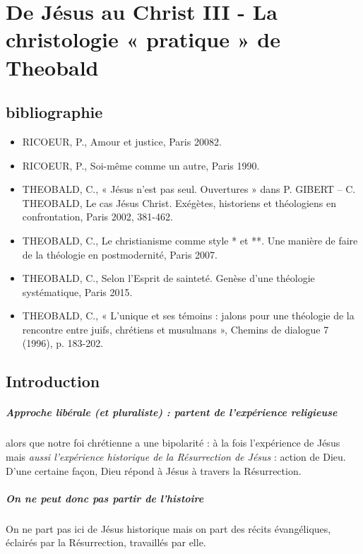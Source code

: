 \chapter{De Jésus au Christ III - La christologie « pratique » de Theobald}
 

\section{bibliographie}

\begin{itemize}
    \item RICOEUR, P., Amour et justice, Paris 20082.
   \item RICOEUR, P., Soi-même comme un autre, Paris 1990.
   \item THEOBALD, C., « Jésus n’est pas seul. Ouvertures » dans P. GIBERT – C. THEOBALD, Le cas
Jésus Christ. Exégètes, historiens et théologiens en confrontation, Paris 2002, 381-462.
   \item THEOBALD, C., Le christianisme comme style * et **. Une manière de faire de la théologie en
postmodernité, Paris 2007. \cite{theobald_christianisme_2007} 
   \item THEOBALD, C., Selon l’Esprit de sainteté. Genèse d’une théologie systématique, Paris 2015.
   \item THEOBALD, C., « L’unique et ses témoins : jalons pour une théologie de la rencontre entre
juifs, chrétiens et musulmans », Chemins de dialogue 7 (1996), p. 183-202.
\end{itemize}

\section{Introduction}


\paragraph{Approche libérale (et pluraliste) : partent de l'expérience religieuse} alors que notre foi chrétienne a une bipolarité : à la fois l'expérience de Jésus mais \textit{aussi l'expérience historique de la Résurrection de Jésus} : action de Dieu. D'une certaine façon, Dieu répond à Jésus à travers la Résurrection.

\paragraph{On ne peut donc pas partir de l'histoire} On ne part pas ici de Jésus historique mais on part des récits évangéliques, éclairés par la Résurrection, travaillés par elle.


